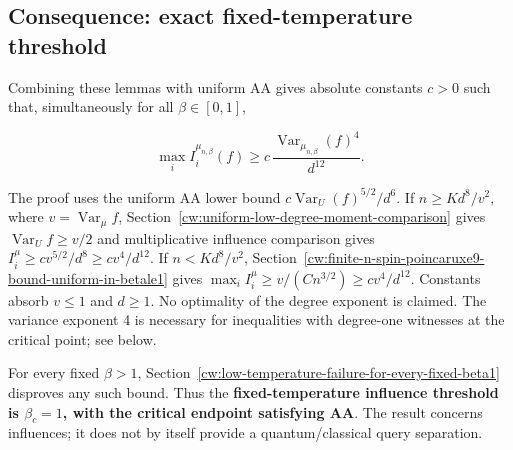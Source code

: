 \subsection{Consequence: exact fixed-temperature threshold}\label{cw:consequence-exact-fixed-ux3b2-threshold}

Combining these lemmas with uniform AA gives absolute constants \(c>0\) such that, simultaneously for all \(\beta\in[0,1]\),

\[
\boxed{\max_i I_i^{\mu_{n,\beta}}(f)
\ge c\,\frac{\operatorname{Var}_{\mu_{n,\beta}}(f)^4}{d^{12}}.}
\]

The proof uses the uniform AA lower bound \(c\operatorname{Var}_U(f)^{5/2}/d^6\). If \(n\ge Kd^8/v^2\), where \(v=\operatorname{Var}_\mu f\), Section~\ref{cw:uniform-low-degree-moment-comparison} gives \(\operatorname{Var}_U f\ge v/2\) and multiplicative influence comparison gives \(I_i^\mu\ge cv^{5/2}/d^8\ge cv^4/d^{12}\). If \(n<Kd^8/v^2\), Section~\ref{cw:finite-n-spin-poincaruxe9-bound-uniform-in-betale1} gives \(\max_i I_i^\mu\ge v/(Cn^{3/2})\ge cv^4/d^{12}\). Constants absorb \(v\le1\) and \(d\ge1\). No optimality of the degree exponent is claimed. The variance exponent 4 is necessary for inequalities with degree-one witnesses at the critical point; see below.

For every fixed \(\beta>1\), Section~\ref{cw:low-temperature-failure-for-every-fixed-beta1} disproves any such bound. Thus the \textbf{fixed-temperature influence threshold is \(\beta_c=1\), with the critical endpoint satisfying AA}. The result concerns influences; it does not by itself provide a quantum/classical query separation.

